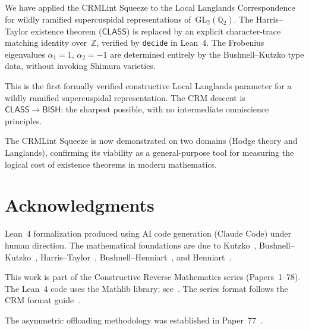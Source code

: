 \documentclass[11pt]{article}
\theoremstyle{plain}
\theoremstyle{definition}
\theoremstyle{remark}
\newcommand{\Z}{\mathbb{Z}}
\newcommand{\Q}{\mathbb{Q}}
\newcommand{\GL}{\mathrm{GL}}
\newcommand{\BISH}{\mathsf{BISH}}
\newcommand{\CLASS}{\mathsf{CLASS}}
\begin{document}
We have applied the CRMLint Squeeze to the Local Langlands
Correspondence for wildly ramified supercuspidal representations
of~$\GL_2(\Q_2)$.  The Harris--Taylor existence theorem
($\CLASS$) is replaced by an explicit character-trace matching
identity over~$\Z$, verified by \texttt{decide} in Lean~4.
The Frobenius eigenvalues $\alpha_1 = 1$, $\alpha_2 = -1$
are determined entirely by the Bushnell--Kutzko type data,
without invoking Shimura varieties.

This is the first formally verified constructive Local
Langlands parameter for a wildly ramified supercuspidal
representation.  The CRM descent is~$\CLASS \to \BISH$: the
sharpest possible, with no intermediate omniscience principles.

The CRMLint Squeeze is now demonstrated on two domains
(Hodge theory and Langlands), confirming its viability as a
general-purpose tool for measuring the logical cost of
existence theorems in modern mathematics.

\section*{Acknowledgments}

Lean~4 formalization produced using AI code generation
(Claude Code) under human direction.  The mathematical
foundations are due to
Kutzko~\cite{Kutzko1980},
Bushnell--Kutzko~\cite{BushnellKutzko1993},
Harris--Taylor~\cite{HarrisTaylor2001},
Bushnell--Henniart~\cite{BushnellHenniart2006},
and Henniart~\cite{Henniart1993}.

This work is part of the Constructive Reverse Mathematics
series (Papers~1--78).  The Lean~4 code uses the Mathlib
library; see~\cite{Mathlib4}.  The series format follows the
CRM format guide~\cite{FormatGuide}.

The asymmetric offloading methodology was established in
Paper~77~\cite{Paper77}.
\end{document}
